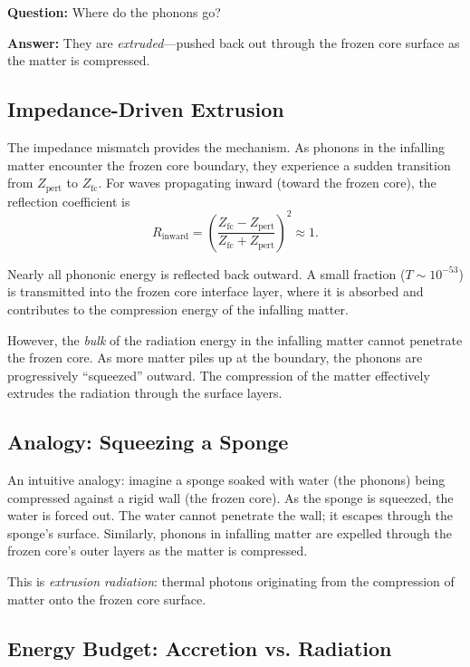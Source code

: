 \documentclass[12pt,a4paper]{article}
\newcommand{\Zfc}{Z_\text{fc}}
\newcommand{\Zpert}{Z_\text{pert}}
\theoremstyle{definition}
\begin{document}
\textbf{Question:} Where do the phonons go?

\textbf{Answer:} They are \emph{extruded}—pushed back out through the frozen core surface as the matter is compressed.

\subsection{Impedance-Driven Extrusion}
\label{subsec:impedance_extrusion}

The impedance mismatch provides the mechanism. As phonons in the infalling matter encounter the frozen core boundary, they experience a sudden transition from $\Zpert$ to $\Zfc$. For waves propagating inward (toward the frozen core), the reflection coefficient is
\begin{equation}
R_\text{inward} = \left( \frac{\Zfc - \Zpert}{\Zfc + \Zpert} \right)^2 \approx 1.
\label{eq:R_inward}
\end{equation}

Nearly all phononic energy is reflected back outward. A small fraction ($T \sim 10^{-53}$) is transmitted into the frozen core interface layer, where it is absorbed and contributes to the compression energy of the infalling matter.

However, the \emph{bulk} of the radiation energy in the infalling matter cannot penetrate the frozen core. As more matter piles up at the boundary, the phonons are progressively ``squeezed'' outward. The compression of the matter effectively extrudes the radiation through the surface layers.

\subsection{Analogy: Squeezing a Sponge}
\label{subsec:sponge_analogy}

An intuitive analogy: imagine a sponge soaked with water (the phonons) being compressed against a rigid wall (the frozen core). As the sponge is squeezed, the water is forced out. The water cannot penetrate the wall; it escapes through the sponge's surface. Similarly, phonons in infalling matter are expelled through the frozen core's outer layers as the matter is compressed.

This is \emph{extrusion radiation}: thermal photons originating from the compression of matter onto the frozen core surface.

\subsection{Energy Budget: Accretion vs. Radiation}
\label{subsec:energy_budget}
\end{document}
